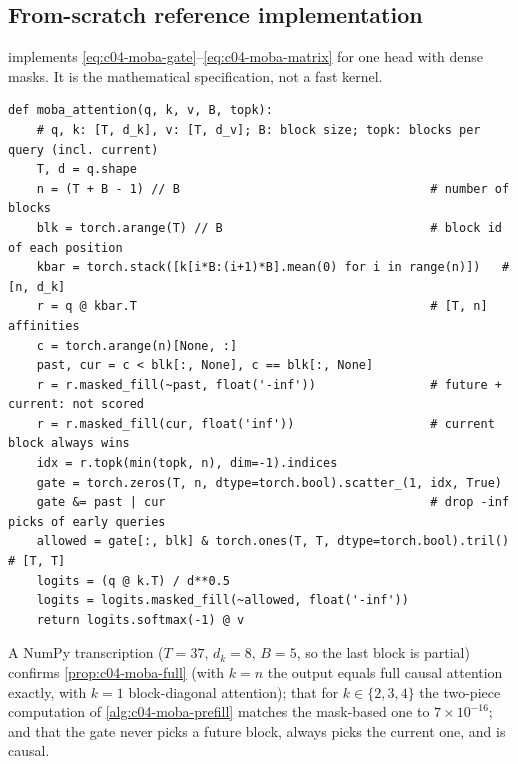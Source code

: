 \subsection{From-scratch reference implementation}

 implements \eqref{eq:c04-moba-gate}--\eqref{eq:c04-moba-matrix} for one
head with dense masks. It is the mathematical specification, not a fast kernel.

\begin{lstlisting}[caption={Reference implementation (ours): MoBA gating and block-sparse attention for one head.},label={lst:c04-moba-ref}]
def moba_attention(q, k, v, B, topk):
    # q, k: [T, d_k], v: [T, d_v]; B: block size; topk: blocks per query (incl. current)
    T, d = q.shape
    n = (T + B - 1) // B                                   # number of blocks
    blk = torch.arange(T) // B                             # block id of each position
    kbar = torch.stack([k[i*B:(i+1)*B].mean(0) for i in range(n)])   # [n, d_k]
    r = q @ kbar.T                                         # [T, n] affinities
    c = torch.arange(n)[None, :]
    past, cur = c < blk[:, None], c == blk[:, None]
    r = r.masked_fill(~past, float('-inf'))                # future + current: not scored
    r = r.masked_fill(cur, float('inf'))                   # current block always wins
    idx = r.topk(min(topk, n), dim=-1).indices
    gate = torch.zeros(T, n, dtype=torch.bool).scatter_(1, idx, True)
    gate &= past | cur                                     # drop -inf picks of early queries
    allowed = gate[:, blk] & torch.ones(T, T, dtype=torch.bool).tril()  # [T, T]
    logits = (q @ k.T) / d**0.5
    logits = logits.masked_fill(~allowed, float('-inf'))
    return logits.softmax(-1) @ v
\end{lstlisting}

A NumPy transcription ($T=37$, $d_k=8$, $B=5$, so the last block is partial) confirms
\cref{prop:c04-moba-full} (with $k=n$ the output equals full causal attention exactly, with $k=1$
block-diagonal attention); that for $k\in\{2,3,4\}$ the two-piece computation of
\cref{alg:c04-moba-prefill} matches the mask-based one to $7\times10^{-16}$; and that the gate never
picks a future block, always picks the current one, and is causal.


